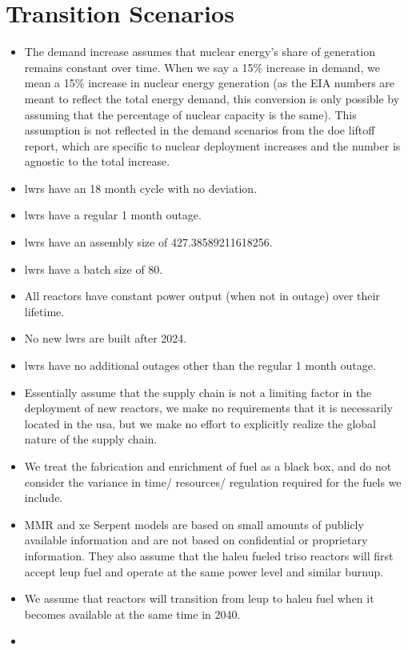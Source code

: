 \section{Transition Scenarios}





\begin{itemize}
    \item The demand increase assumes that nuclear energy's share of generation remains constant over time. When we say a 15$\%$ increase in demand, we mean a 15$\%$ increase in nuclear energy generation (as the EIA numbers are meant to reflect the total energy demand, this conversion is only possible by assuming that the percentage of nuclear capacity is the same). This assumption is not reflected in the demand scenarios from the \gls{doe} liftoff report, which are specific to nuclear deployment increases and the number is agnostic to the total increase.
    \item \gls{lwr}s have an 18 month cycle with no deviation.
    \item \gls{lwr}s have a regular 1 month outage.
    \item \gls{lwr}s have an assembly size of 427.38589211618256.
    \item \gls{lwr}s have a batch size of 80.
    \item All reactors have constant power output (when not in outage) over their lifetime.
    \item No new \gls{lwr}s are built after 2024. %
    \item \gls{lwr}s have no additional outages other than the regular 1 month outage.
    \item Essentially assume that the supply chain is not a limiting factor in the deployment of new reactors, we make no requirements that it is necessarily located in the \gls{usa}, but we make no effort to explicitly realize the global nature of the supply chain.
    \item We treat the fabrication and enrichment of fuel as a black box, and do not consider the variance in time/ resources/ regulation required for the fuels we include.
    \item MMR and \gls{xe} Serpent models are based on small amounts of publicly available information and are not based on confidential or proprietary information. They also assume that the \gls{haleu} fueled \gls{triso} reactors will first accept \gls{leup} fuel and operate at the same power level and similar burnup.
    \item We assume that reactors will transition from \gls{leup} to \gls{haleu} fuel when it becomes available at the same time in 2040.
    \item
\end{itemize}


